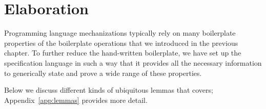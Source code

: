 \chapter{Elaboration}\label{ch:elaboration}
Programming language mechanizations typically rely on many boilerplate
properties of the boilerplate operations that we introduced in the previous
chapter. To further reduce the hand-written boilerplate, we have set up the
\Knot specification language in such a way that it provides all the necessary
information to generically state and prove a wide range of these properties.


Below we discuss different kinds of ubiquitous lemmas that \Needle covers;
Appendix~\ref{app:lemmas} provides more detail.


 \clearpage





